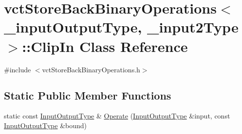 \hypertarget{classvct_store_back_binary_operations_1_1_clip_in}{\section{vct\-Store\-Back\-Binary\-Operations$<$ \-\_\-input\-Output\-Type, \-\_\-input2\-Type $>$\-:\-:Clip\-In Class Reference}
\label{classvct_store_back_binary_operations_1_1_clip_in}
}


{\ttfamily \#include $<$vct\-Store\-Back\-Binary\-Operations.\-h$>$}

\subsection*{Static Public Member Functions}
\begin{DoxyCompactItemize}
\item 
static const \hyperlink{classvct_store_back_binary_operations_a9dc481d9e1345541dd5d833d5e5688f3}{Input\-Output\-Type} \& \hyperlink{classvct_store_back_binary_operations_1_1_clip_in_a3c10d2231d05540785b1b3ed98744124}{Operate} (\hyperlink{classvct_store_back_binary_operations_a9dc481d9e1345541dd5d833d5e5688f3}{Input\-Output\-Type} \&input, const \hyperlink{classvct_store_back_binary_operations_a9dc481d9e1345541dd5d833d5e5688f3}{Input\-Output\-Type} \&bound)
\end{DoxyCompactItemize}


